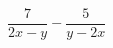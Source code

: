 \begin{ex}[type=expressions]
	\begin{condition}
		\( \dfrac{7}{2x-y}-\dfrac{5}{y-2x} \)
	\end{condition}
\end{ex}